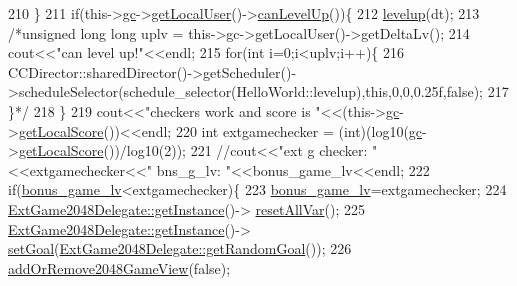 \begin{DoxyCode}
210         \}
211         \textcolor{keywordflow}{if}(this->\hyperlink{class_hello_world_a547cb213126911d9a7151f8259dc7102}{gc}->\hyperlink{class_tetris_1_1_game_controller_abc67d4b309ce2886b43a3b4e0af22abc}{getLocalUser}()->\hyperlink{class_tetris_1_1_users_1_1_game_user_a93e385fd100ac5ec2f6f6b9f0fab2950}{canLevelUp}())\{
212             \hyperlink{class_hello_world_af1590254503ba391a084d767df2dd858}{levelup}(dt);
213             \textcolor{comment}{/*unsigned long long uplv = this->gc->getLocalUser()->getDeltaLv();}
214 \textcolor{comment}{            cout<<"can level up!"<<endl;}
215 \textcolor{comment}{            for(int i=0;i<uplv;i++)\{}
216 \textcolor{comment}{               
       CCDirector::sharedDirector()->getScheduler()->scheduleSelector(schedule\_selector(HelloWorld::levelup),this,0,0,0.25f,false);}
217 \textcolor{comment}{            \}*/}
218         \}
219         cout<<\textcolor{stringliteral}{"checkers work and score is "}<<(this->\hyperlink{class_hello_world_a547cb213126911d9a7151f8259dc7102}{gc}->\hyperlink{class_tetris_1_1_game_controller_ad88f3362af23d87282ee8ed39394054d}{getLocalScore}())<<endl;
220         \textcolor{keywordtype}{int} extgamechecker = (int)(log10(\hyperlink{class_hello_world_a547cb213126911d9a7151f8259dc7102}{gc}->\hyperlink{class_tetris_1_1_game_controller_ad88f3362af23d87282ee8ed39394054d}{getLocalScore}())/log10(2));
221         \textcolor{comment}{//cout<<"ext g checker: "<<extgamechecker<<"  bns\_g\_lv: "<<bonus\_game\_lv<<endl;}
222         \textcolor{keywordflow}{if}(\hyperlink{class_hello_world_a7832a6ec52f92f460f3fc352a06412f4}{bonus\_game\_lv}<extgamechecker)\{
223             \hyperlink{class_hello_world_a7832a6ec52f92f460f3fc352a06412f4}{bonus\_game\_lv}=extgamechecker;
224             \hyperlink{classhsh_1_1_code_lady_j_j_y_1_1game2048_1_1_scene_delegate_a332a574da455fb687b5d283399a6976c}{ExtGame2048Delegate::getInstance}()->
      \hyperlink{classhsh_1_1_code_lady_j_j_y_1_1game2048_1_1_scene_delegate_a07cb2b429428f54e4291c4c8dc63b4ac}{resetAllVar}();
225             \hyperlink{classhsh_1_1_code_lady_j_j_y_1_1game2048_1_1_scene_delegate_a332a574da455fb687b5d283399a6976c}{ExtGame2048Delegate::getInstance}()->
      \hyperlink{classhsh_1_1_code_lady_j_j_y_1_1game2048_1_1_scene_delegate_af6805111081144b68d039d8f71d1ed0b}{setGoal}(\hyperlink{classhsh_1_1_code_lady_j_j_y_1_1game2048_1_1_scene_delegate_abb107cf268a50b3ebd9bd545c88a9a35}{ExtGame2048Delegate::getRandomGoal}());
226             \hyperlink{class_hello_world_ad3ea29ba5aa294fc4e4f8ee41833b702}{addOrRemove2048GameView}(\textcolor{keyword}{false});

\end{DoxyCode}
